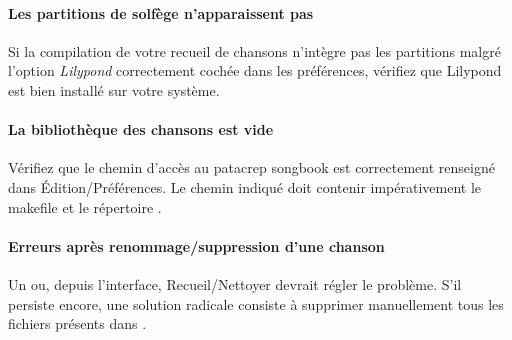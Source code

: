 \paragraph{Les partitions de solfège n'apparaissent pas}
Si la compilation de votre recueil de chansons n'intègre pas les
partitions malgré l'option \emph{Lilypond} correctement cochée dans les
préférences, vérifiez que Lilypond est bien installé sur votre système. 

\paragraph{La bibliothèque des chansons est vide} 
Vérifiez que le chemin d'accès au patacrep songbook est correctement
renseigné dans Édition/Préférences.  Le chemin indiqué doit contenir
impérativement le makefile et le répertoire .

\paragraph{Erreurs après renommage/suppression d'une chanson} 
Un  ou, depuis l'interface, Recueil/Nettoyer devrait
régler le problème. S'il persiste encore, une solution radicale
consiste à supprimer manuellement tous les fichiers  présents
dans .

